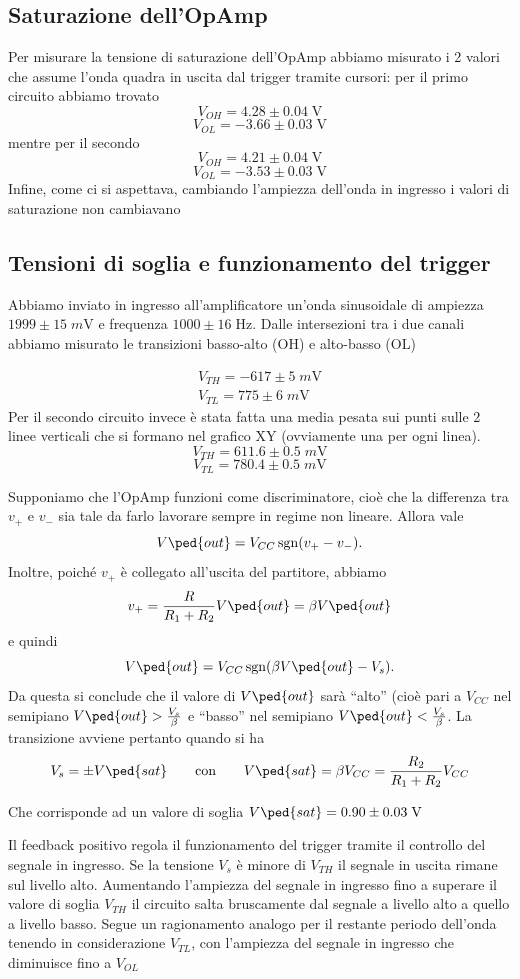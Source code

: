\documentclass[10pt,a4paper]{article}
\begin{document}
\subsection{Saturazione dell'OpAmp}
Per misurare la tensione di saturazione dell'OpAmp abbiamo misurato i 2 valori che assume l'onda quadra in uscita dal trigger tramite cursori:
per il primo circuito abbiamo trovato
\[
V_{OH} = 4.28 \pm 0.04 \; \si{\V}
\]
\[
V_{OL} = -3.66 \pm 0.03 \; \si{\V}
\]
mentre per il secondo
\[
V_{OH} = 4.21 \pm 0.04 \; \si{\V}
\]
\[
V_{OL} = -3.53 \pm 0.03 \; \si{\V}
\]
Infine, come ci si aspettava, cambiando l'ampiezza dell'onda in ingresso i valori di saturazione non cambiavano
\subsection{Tensioni di soglia e funzionamento del trigger}
Abbiamo inviato in ingresso all'amplificatore un'onda sinusoidale di ampiezza
$1999 \pm 15 \; \si{m\V}$ e frequenza $1000 \pm 16 \; \si{\Hz}$.
Dalle intersezioni tra i due canali abbiamo misurato le transizioni basso-alto
(OH) e alto-basso (OL)

\begin{align*}
V_{TH} = -617 \pm 5 \; \si{m\V} \\
V_{TL} = 775 \pm 6 \; \si{m\V}
\end{align*}
Per il secondo circuito invece è stata fatta una media pesata sui punti sulle 2 linee verticali che si formano nel grafico XY (ovviamente una per ogni linea).
\[
V_{TH} = 611.6 \pm 0.5 \; \si{m\V}
\]
\[
V_{TL} = 780.4 \pm 0.5 \; \si{m\V}
\]

Supponiamo che l'OpAmp funzioni come discriminatore, cioè che la differenza tra $v_+ $ e $v_- $ sia tale da farlo lavorare sempre in regime non lineare. Allora vale
\[ V\ped{out} = V_{CC} \sgn(v_+ - v_-). \]
Inoltre, poiché $v_+ $ è collegato all'uscita del partitore, abbiamo
\[ v_+ = \frac{R}{R_1 + R_2} V \ped{out} = \beta V\ped{out} \]
e quindi
\[
V\ped{out} = V_{CC} \sgn(\beta V\ped{out} - V_s)
.\]
Da questa si conclude che il valore di $V\ped{out} $ sarà ``alto''
(cioè pari a $ V_{CC} $ nel semipiano $V\ped{out} > \frac{V_s}{\beta}$ e
``basso'' nel semipiano $ V \ped{out} < \frac{V_s}{\beta}$. La transizione
avviene pertanto quando si ha
\[
V_s = \pm V \ped{sat} \qquad\text{con}\qquad V \ped{sat} = \beta V_{CC} = \frac{R_2}{R_1 + R_2} V_{CC}
\]

Che corrisponde ad un valore di soglia $V\ped{sat} = 0.90 \pm 0.03 \; \si{\V}$

Il feedback positivo regola il funzionamento del trigger tramite il controllo del segnale in ingresso. Se la tensione $V_s$ è minore di $V_{TH}$ il segnale in uscita rimane sul livello alto. Aumentando l’ampiezza del segnale in ingresso fino a superare il valore di soglia $V_{TH}$ il circuito salta bruscamente dal segnale a livello alto a quello a livello basso. Segue un ragionamento analogo per il restante periodo dell’onda tenendo in considerazione $V_{TL}$, con l’ampiezza del segnale in ingresso che
diminuisce fino a $V_{OL}$
\end{document}
